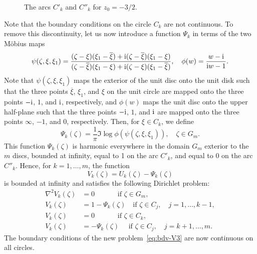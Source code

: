 \begin{figure}[ht] %
\centerline{
}
\caption{The arcs $C'_k$ and $C''_k$ for $z_0=-3/2$.}
\label{fig:h3d}
\end{figure}


Note that the boundary conditions on the circle $C_k$ are not continuous. To remove this discontinuity, let us now introduce a function $\Psi_k$ in terms of the two M\"obius maps
\begin{equation}
\psi(\zeta,\xi,\xi_1)=\frac{(\zeta-\xi)(\xi_1-\overline{\xi})+\mathrm{i}(\zeta-\overline{\xi})(\xi_1-\xi)}{(\zeta-\overline{\xi})(\xi_1-\xi)+\mathrm{i}(\zeta-\xi)(\xi_1-\overline{\xi})}, \quad
\phi(w)=\frac{w-\mathrm{i}}{\mathrm{i} w-1}.
\end{equation}
Note that $\psi(\zeta,\xi,\xi_1)$ maps the exterior of the unit disc onto the unit disk such that the three points $\overline{\xi}$, $\xi_1$, and $\xi$ on the unit circle are mapped onto the three points $-\mathrm{i}$, $1$, and $\mathrm{i}$, respectively, and $\phi(w)$ maps the unit disc onto the upper half-plane such that the three points $-\mathrm{i}$, $1$, and $\mathrm{i}$ are mapped onto the three points $\infty$, $-1$, and $0$, respectively.
Then, for $\xi\in C_k$, we define 
\begin{equation}\label{eq:Psi}
\Psi_k(\zeta)=\frac{1}{\pi}\Im \log \phi(\psi(\zeta,\xi,\xi_1)), \quad \zeta\in G_m.
\end{equation}
This function $\Psi_k(\zeta)$ is harmonic everywhere in the domain $G_m$ exterior to the $m$ discs, bounded at infinity, equal to 1 on the arc $C'_k$, and equal to $0$ on the arc $C''_k$.
Hence, for $k=1,\ldots,m$, the function 
\begin{equation}\label{eq:Uk-Vk}
V_k(\zeta)=U_k(\zeta)-\Psi_k(\zeta)
\end{equation}
is bounded at infinity and satisfies the following Dirichlet problem:
\begin{subequations}\label{eq:bdv-V3}
	\begin{align}
	\label{eq:V3-Lap}
	\nabla^2 V_k(\zeta) &= 0  ~~~~~~~~~~~~~~\,    \mbox{if }\zeta\in G_m, \\
	\label{eq:V3-m}
	V_k(\zeta)&= 1-\Psi_k(\zeta) \quad   \mbox{if }\zeta\in C_j, \quad j=1,\ldots,k-1, \\
	\label{eq:V3-k'}
	V_k(\zeta)&= 0         ~~~~~~~~~~~~~~\,        \mbox{if }\zeta\in C_k,  \\
	\label{eq:V3-p}
	V_k(\zeta)&= -\Psi_k(\zeta)  ~~~~~~  \mbox{if }\zeta\in C_j, \quad j=k+1,\ldots,m. 
	\end{align}
\end{subequations}
The boundary conditions of the new problem~\eqref{eq:bdv-V3} are now continuous on all circles. 





